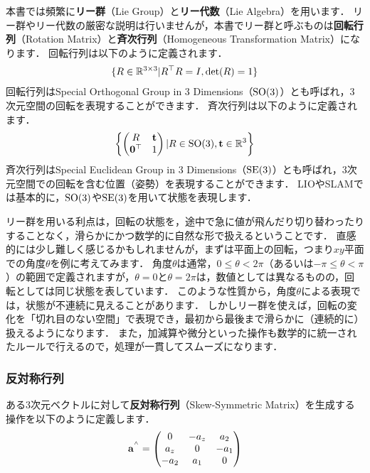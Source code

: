 本書では頻繁に{\bf リー群}（Lie Group）と{\bf リー代数}（Lie Algebra）を用います．
リー群やリー代数の厳密な説明は行いませんが，本書でリー群と呼ぶものは{\bf 回転行列}（Rotation Matrix）と{\bf 斉次行列}（Homogeneous Transformation Matrix）になります．
回転行列は以下のように定義されます．
%
\begin{align}
  \{R \in \mathbb{R}^{3 \times 3} | R^{\top} R = I, {\rm det}(R) = 1\} \\
\end{align}
%
回転行列はSpecial Orthogonal Group in 3 Dimensions（${\rm SO}(3)$）とも呼ばれ，3次元空間の回転を表現することができます．
斉次行列は以下のように定義されます．
%
\begin{align}
  \left\{ \left( \begin{matrix} R & {\bf t} \\ {\bf 0}^{\top} & 1 \end{matrix} \right) | R \in {\rm SO}(3), {\bf t} \in \mathbb{R}^{3} \right\}
\end{align}
%
斉次行列はSpecial Euclidean Group in 3 Dimensions（${\rm SE}(3)$）とも呼ばれ，3次元空間での回転を含む位置（姿勢）を表現することができます．
LIOやSLAMでは基本的に，${\rm SO}(3)$や${\rm SE}(3)$を用いて状態を表現します．

リー群を用いる利点は，回転の状態を，途中で急に値が飛んだり切り替わったりすることなく，滑らかにかつ数学的に自然な形で扱えるということです．
直感的には少し難しく感じるかもしれませんが，まずは平面上の回転，つまり$xy$平面での角度$\theta$を例に考えてみます．
角度$\theta$は通常，$0 \leq \theta < 2\pi$（あるいは$-\pi \leq \theta < \pi$）の範囲で定義されますが，$\theta = 0$と$\theta = 2\pi$は，数値としては異なるものの，回転としては同じ状態を表しています．
このような性質から，角度$\theta$による表現では，状態が不連続に見えることがあります．
しかしリー群を使えば，回転の変化を「切れ目のない空間」で表現でき，最初から最後まで滑らかに（連続的に）扱えるようになります．
また，加減算や微分といった操作も数学的に統一されたルールで行えるので，処理が一貫してスムーズになります．

\subsubsection{反対称行列}

ある3次元ベクトルに対して{\bf 反対称行列}（Skew-Symmetric Matrix）を生成する操作を以下のように定義します．
%
\begin{align}
  {\bf a}^{^\wedge} = \left( \begin{matrix}
                        0     & -a_{z} & a_{2} \\
                        a_{z} & 0      & -a_{1} \\
                        -a_{2} & a_{1} & 0
                      \end{matrix} \right)
  \label{eq:skew_symmetric_matrix}
\end{align}


